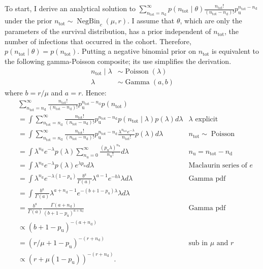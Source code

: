 \documentclass[12pt, letterpaper]{article} %
\def\dist{\sim}
\DeclareMathOperator{\Poi}{Poisson}
\DeclareMathOperator{\NBr}{NegBin}
\newcommand{\NBc}{\NBr_{c}}
\DeclareMathOperator{\GamDist}{Gamma}
\newcommand{\ntot}{n_\text{tot}}
\newcommand{\ndet}{n_\text{d}}
\newcommand{\nnodet}{n_\text{u}}
\newcommand{\pnodet}{p_\text{u}}
\begin{document}
To start, I derive an analytical solution to $\sum_{\ntot=\ndet}^\infty p(\ntot \mid \theta) \frac{\ntot!}{(\ntot - \ndet)!} \pnodet^{\ntot - \ndet}$ under the prior $\ntot \dist \NBc(\mu, r)$.
I assume that $\theta$, which are only the parameters of the survival distribution, has a prior independent of $\ntot$, the number of infections that occurred in the cohort.
Therefore, $p(\ntot \mid \theta) = p(\ntot)$.
Putting a negative binomial prior on $\ntot$ is equivalent to the following gamma-Poisson composite; its use simplifies the derivation.
\begin{align}
\ntot \mid \lambda &\dist \Poi(\lambda) \\
\lambda &\dist \GamDist(a, b)
\end{align}
where $b = r / \mu$ and $a = r$.
Hence:
\begin{align}
&\sum_{\ntot=\ndet}^\infty \frac{\ntot!}{(\ntot-\ndet)!} \pnodet^{\ntot-\ndet} p(\ntot) \\
&= \int \sum_{\ntot=\ndet}^\infty \frac{\ntot!}{(\ntot-\ndet)!} \pnodet^{\ntot-\ndet} p(\ntot \mid \lambda) p(\lambda) d\lambda &\text{$\lambda$ explicit}\\
&= \int \sum_{\ntot=\ndet}^\infty \frac{\ntot!}{(\ntot-\ndet)!} \pnodet^{\ntot-\ndet} \frac{\lambda^{\ntot} e^{-\lambda}}{\ntot!} p(\lambda) d\lambda &\ntot \dist \Poi\\
&= \int \lambda^{\ndet} e^{-\lambda} p(\lambda) \sum_{\nnodet=0}^\infty \frac{(\pnodet \lambda)^{\nnodet}}{\nnodet!} d\lambda &\nnodet = \ntot-\ndet\\
&= \int \lambda^{\ndet} e^{-\lambda} p(\lambda) e^{\lambda \pnodet} d\lambda &\text{Maclaurin series of $e$} \\
&= \int \lambda^{\ndet} e^{-\lambda(1 - \pnodet)} \frac{b^a}{\Gamma(a)} \lambda^{a-1} e^{-b\lambda} \lambda d\lambda &\text{Gamma pdf}\\
&= \int \frac{b^a}{\Gamma(a)} \lambda^{a+\ndet-1} e^{-(b+1-\pnodet)\lambda} \lambda d\lambda \\
&= \frac{b^a}{\Gamma(a)} \frac{\Gamma(a+\ndet)}{(b+1-\pnodet)^{a+\ndet}} &\text{Gamma pdf}\\
&\propto (b+1-\pnodet)^{-(a+\ndet)} \\
&= (r/\mu + 1 - \pnodet)^{-(r+\ndet)} &\text{sub in $\mu$ and $r$}\\
&\propto(r + \mu (1- \pnodet))^{-(r+\ndet)}.
\end{align}
\end{document}
